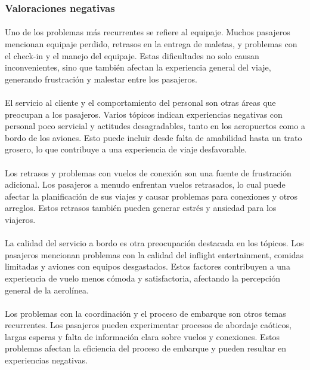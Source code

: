 \documentclass{report}
\begin{document}
{{                \subsubsection*{Valoraciones negativas}
                    \paragraph*{}{
                        Uno de los problemas más recurrentes se refiere al equipaje. Muchos pasajeros mencionan equipaje perdido, retrasos en la entrega de maletas, y problemas con el check-in y el manejo del equipaje. Estas dificultades no solo causan inconvenientes, sino que también afectan la experiencia general del viaje, generando frustración y malestar entre los pasajeros.
                    }
                    \paragraph*{}{
                        El servicio al cliente y el comportamiento del personal son otras áreas que preocupan a los pasajeros. Varios tópicos indican experiencias negativas con personal poco servicial y actitudes desagradables, tanto en los aeropuertos como a bordo de los aviones. Esto puede incluir desde falta de amabilidad hasta un trato grosero, lo que contribuye a una experiencia de viaje desfavorable.
                    }
                    \paragraph*{}{
                        Los retrasos y problemas con vuelos de conexión son una fuente de frustración adicional. Los pasajeros a menudo enfrentan vuelos retrasados, lo cual puede afectar la planificación de sus viajes y causar problemas para conexiones y otros arreglos. Estos retrasos también pueden generar estrés y ansiedad para los viajeros.
                    }
                    \paragraph*{}{
                        La calidad del servicio a bordo es otra preocupación destacada en los tópicos. Los pasajeros mencionan problemas con la calidad del inflight entertainment, comidas limitadas y aviones con equipos desgastados. Estos factores contribuyen a una experiencia de vuelo menos cómoda y satisfactoria, afectando la percepción general de la aerolínea.
                    }
                    \paragraph*{}{
                        Los problemas con la coordinación y el proceso de embarque son otros temas recurrentes. Los pasajeros pueden experimentar procesos de abordaje caóticos, largas esperas y falta de información clara sobre vuelos y conexiones. Estos problemas afectan la eficiencia del proceso de embarque y pueden resultar en experiencias negativas.
                    }
}}
\end{document}
